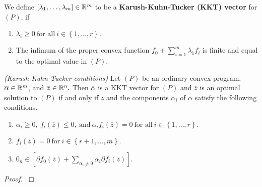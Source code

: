 \begin{definition}
  We define 
  $
    [\lambda_1, \ldots, \lambda_m]\in \mathbb{R}^m
  $
  to be a \textbf{Karush-Kuhn-Tucker (KKT) vector}
  for $(P)$, if
  \begin{enumerate}[label={(\roman*)}]
    \item
      $
        \lambda_i \ge 0
        \ 
        \text{for all}
        \ 
        i\in \left\{ 1,\ldots,r \right\}.
      $
    \item
      The infimum of the proper convex function 
      $
        f_0
        +
        \sum_{i=1}^{m}
        \lambda_1 f_i
      $
      is finite and equal to the optimal value in $(P).$
  \end{enumerate}
\end{definition}

\begin{ftheorem}
  \emph{(Karush-Kuhn-Tucker conditions)}
  Let $(P)$
  be an ordinary convex program,
  $
  \overline{\alpha}
  \in \mathbb{R}^m
  $,
   and 
   $
   \overline{z}
   \in \mathbb{R}^n.
   $
   Then 
   $
  \overline{\alpha}
   $
   is a KKT vector for $(P)$
   and 
   $
   \overline{z}
   $
   is an optimal solution to $(P)$
   if and only if 
   $
   \overline{z}
   $
   and 
   the components $\alpha_i$ of
   $
  \overline{\alpha}
   $
   satisfy 
   the following conditions.

  \begin{enumerate}[label={(\roman*)}]
    \item
      $
        \alpha_i \ge 0,
        \ 
        f_i(
   \overline{z}
        )
        \le 0,
        \ 
        \text{and}
        \ 
        \alpha_i 
        f_i(
   \overline{z}
        )
        =0
        \ 
        \text{for all}
        \ 
        i\in \left\{ 1, \ldots, r \right\}
        .
      $
      \item
        $
        f_i(
   \overline{z}
        )
        =0
        \ 
        \text{for}
        \ 
        i\in \left\{ r+1, \ldots, m \right\}
        .
        $
      \item
        $
         0
         _n
         \in 
         [
          \partial
        f_0(
   \overline{z}
        )
        +
        \sum_{\alpha_i\neq 0}
        \alpha_i 
        \partial
        f_i(
   \overline{z}
        )
         ]
.
        $
  \end{enumerate}
\end{ftheorem}
\begin{proof}
  \cite[Theorem~28.3]{Rockafellar1970}
\end{proof}
